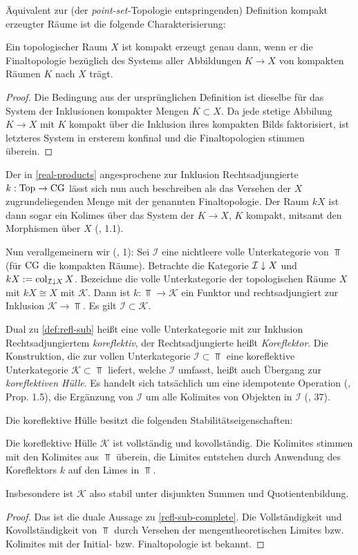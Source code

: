 Äquivalent zur (der \emph{point-set-}Topologie entspringenden)
Definition kompakt erzeugter Räume ist die folgende Charakterisierung:
\begin{lemma}
  Ein topologischer Raum $X$ ist kompakt erzeugt genau dann, wenn er
  die Finaltopologie bezüglich des Systems aller Abbildungen $K \to X$
  von kompakten Räumen $K$ nach $X$ trägt.
\end{lemma}
\begin{proof}
  Die Bedingung aus der ursprünglichen Definition ist dieselbe für das
  System der Inklusionen kompakter Mengen $K \subset X$. Da jede
  stetige Abbilung $K \to X$ mit $K$ kompakt über die Inklusion ihres
  kompakten Bilds faktorisiert, ist letzteres System in ersterem
  konfinal und die Finaltopologien stimmen überein.
\end{proof}
Der in \ref{real-products} angesprochene zur Inklusion
Rechtsadjungierte $k: \operatorname{Top} \to \operatorname{CG}$ lässt sich nun auch beschreiben
als das Versehen der $X$ zugrundeliegenden Menge mit der genannten
Finaltopologie. Der Raum $kX$ ist dann sogar ein Kolimes über das
System der $K \to X$, $K$ kompakt, mitsamt den Morphismen über $X$
(\cite{Vogt}, 1.1).

Nun verallgemeinern wir (\cite{Vogt}, 1): Sei $\mathcal{I}$ eine
nichtleere volle Unterkategorie von $\Top$ (für $\operatorname{CG}$ die kompakten
Räume). Betrachte die Kategorie $\mathcal{I} \downarrow \! {\scriptstyle } \, X$ und $kX
:= \operatorname{col}_{\mathcal{I} \downarrow \! {\scriptstyle } \, X} X$. Bezeichne die volle
Unterkategorie der topologischen Räume $X$ mit $kX \cong X$ mit
$\mathcal{K}$. Dann ist $k: \Top \to \mathcal{K}$ ein Funktor und
rechtsadjungiert zur Inklusion $\mathcal{K} \to \Top$. Es gilt
$\mathcal{I} \subset \mathcal{K}$.
\begin{bem} \label{corefl}
  Dual zu \ref{def:refl-sub} heißt eine volle Unterkategorie mit zur
  Inklusion Rechtsadjungiertem \emph{koreflektiv}, der
  Rechtsadjungierte heißt \emph{Koreflektor}. Die Konstruktion, die
  zur vollen Unterkategorie $\mathcal{I} \subset \Top$ eine
  koreflektive Unterkategorie $\mathcal{K} \subset \Top$ liefert,
  welche $\mathcal{I}$ umfasst, heißt auch Übergang zur
  \emph{koreflektiven Hülle}. Es handelt sich tatsächlich um eine
  idempotente Operation (\cite{Vogt}, Prop. 1.5), die Ergänzung von
  $\mathcal{I}$ um alle Kolimites von Objekten in $\mathcal{I}$
  (\cite{Herrlich}, 37).
\end{bem}
Die koreflektive Hülle besitzt die folgenden Stabilitätseigenschaften:
\begin{prop} \label{k-complete}
  Die koreflektive Hülle $\mathcal{K}$ ist vollständig und
  kovollständig. Die Kolimites stimmen mit den Kolimites aus $\Top$
  überein, die Limites entstehen durch Anwendung des Koreflektors $k$
  auf den Limes in $\Top$.
\end{prop}
Insbesondere ist $\mathcal{K}$ also stabil unter disjunkten Summen und
Quotientenbildung.
\begin{proof}
  Das ist die duale Aussage zu \ref{refl-sub-complete}. Die
  Vollständigkeit und Kovollständigkeit von $\Top$ durch Versehen der
  mengentheoretischen Limites bzw. Kolimites mit der Initial-
  bzw. Finaltopologie ist bekannt.
\end{proof}

